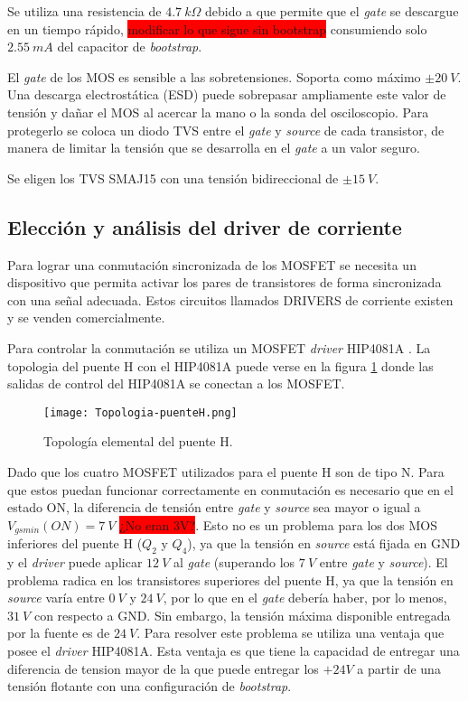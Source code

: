 \noindent Se utiliza una resistencia de $4.7 \:k\Omega$ debido a que permite que el \textsl{gate} se descargue en un tiempo rápido, \colorbox{red}{modificar lo que sigue sin bootstrap} consumiendo solo $2.55\:mA$ del capacitor de \textsl{bootstrap}.


\noindent El \textsl{gate} de los MOS es sensible a las sobretensiones. Soporta como máximo $\pm 20\:V$. Una descarga electrostática (ESD) puede sobrepasar ampliamente este valor de tensión y dañar el MOS al acercar la mano o la sonda del osciloscopio. Para protegerlo se coloca un diodo TVS entre el \textsl{gate} y \textsl{source} de cada transistor, de manera de limitar la tensión que se desarrolla en el \textsl{gate} a un valor seguro.

\noindent Se eligen los TVS SMAJ15 con una tensión bidireccional de $\pm 15\:V$.


\subsection{Elección y análisis del driver de corriente}

Para lograr una conmutación sincronizada de los MOSFET se necesita un dispositivo que permita activar los pares de transistores de forma sincronizada con una señal adecuada. Estos circuitos llamados DRIVERS de corriente existen y se venden comercialmente. 

Para controlar la conmutación se utiliza un MOSFET \textsl{driver} HIP4081A \cite{HIP4081A_FN3659}. La topologia del puente H con el HIP4081A puede verse en la figura \ref{fig:img_topologia-puenteH} donde las salidas de control del HIP4081A se conectan a los MOSFET.

\begin{figure}[H]
	\centering
	\texttt{[image: Topologia-puenteH.png]}
	\caption{Topología elemental del puente H.}
	\label{fig:img_topologia-puenteH}
\end{figure}

Dado que los cuatro MOSFET utilizados para el puente H son de tipo N. Para que estos puedan funcionar correctamente en conmutación es necesario que en el estado ON, la diferencia de tensión entre \textsl{gate} y \textsl{source} sea mayor o igual a $V_{gs min}(ON) = 7\:V$ \colorbox{red}{¿No eran 3V?}. Esto no es un problema para los dos MOS inferiores del puente H ($Q_2$ y $Q_4$), ya que la tensión en \textsl{source} está fijada en GND y el \textsl{driver} puede aplicar $12\:V$ al \textsl{gate} (superando los $7\:V$ entre \textsl{gate} y \textsl{source}). El problema radica en los transistores superiores del puente H, ya que la tensión en \textsl{source} varía entre $0\:V$ y $24\:V$, por lo que en el \textsl{gate} debería haber, por lo menos, $31\:V$ con respecto a GND. Sin embargo, la tensión máxima disponible entregada por la fuente es de $24\:V$. Para resolver este problema se utiliza una ventaja que posee el \textsl{driver} HIP4081A. Esta ventaja es que tiene la capacidad de entregar una diferencia de tension mayor de la que puede entregar los $+24 V$ a partir de una tensión flotante con una configuración de \textsl{bootstrap}.

